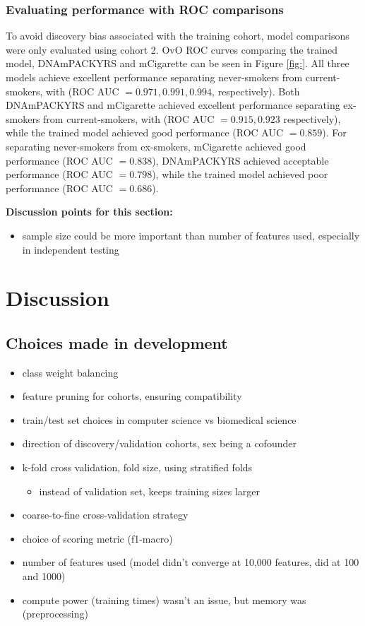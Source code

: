 \documentclass{article}
\begin{document}
\subsubsection{Evaluating  performance with ROC comparisons}
To avoid discovery bias associated with the training cohort, model comparisons were only evaluated using cohort 2. OvO ROC curves comparing the trained model, DNAmPACKYRS and mCigarette can be seen in Figure \ref{fig:}. All three models achieve excellent performance separating never-smokers from current-smokers, with (ROC AUC \(= 0.971, 0.991, 0.994\), respectively). Both DNAmPACKYRS and mCigarette achieved excellent performance separating ex-smokers from current-smokers, with (ROC AUC \(= 0.915, 0.923\) respectively), while the trained model achieved good performance (ROC AUC \(= 0.859\)). For separating never-smokers from ex-smokers, mCigarette achieved good performance (ROC AUC \(= 0.838\)), DNAmPACKYRS achieved acceptable performance (ROC AUC \(= 0.798\)), while the trained model achieved poor performance (ROC AUC \(= 0.686\)). 

\textbf{Discussion points for this section:}
\begin{itemize}
    \item sample size could be more important than number of features used, especially in independent testing
\end{itemize}

\section{Discussion}

\subsection*{Choices made in development}
\begin{itemize}
    \item class weight balancing
    \item feature pruning for cohorts, ensuring compatibility
    \item train/test set choices in computer science vs biomedical science
    \item direction of discovery/validation cohorts, sex being a cofounder
    \item k-fold cross validation, fold size, using stratified folds
          \begin{itemize}
              \item instead of validation set, keeps training sizes larger
          \end{itemize}
    \item coarse-to-fine cross-validation strategy
    \item choice of scoring metric (f1-macro)
    \item number of features used (model didn't converge at 10,000 features, did at 100 and 1000)
    \item compute power (training times) wasn't an issue, but memory was (preprocessing)
\end{itemize}
\end{document}
